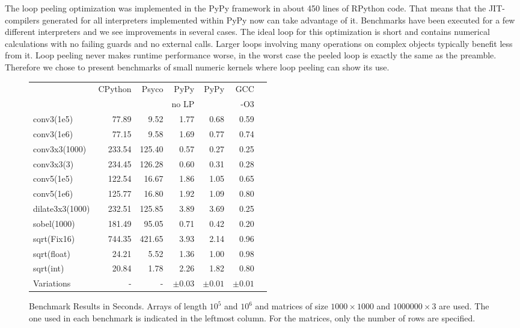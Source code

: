 \documentclass[preprint]{sigplanconf}
\begin{document}
The loop peeling optimization was implemented in the PyPy
framework in about 450 lines of RPython code. That means that the JIT-compilers generated for all
interpreters implemented within PyPy now can take advantage of
it. Benchmarks have been executed for a few different interpreters and
we see improvements in several cases. The ideal loop for this optimization
is short and contains numerical calculations with no failing guards and no
external calls. Larger loops involving many operations on complex objects
typically benefit less from it. Loop peeling never makes runtime performance worse, in
the worst case the peeled loop is exactly the same as the preamble. Therefore we
chose to present benchmarks of small numeric kernels where loop peeling can show
its use.

\begin{figure}
\begin{center}
{\smaller
\begin{tabular}{|l|r|r|r|r|r|r|}
\hline
 & CPython & Psyco & PyPy  & PyPy & GCC \\
 &         &       & no LP &      & -O3 \\
\hline
conv3(1e5) & 77.89 & 9.52 & 1.77  & 0.68 &  0.59 \\
\hline
conv3(1e6) & 77.15 & 9.58 & 1.69  & 0.77 &  0.74 \\
\hline
conv3x3(1000) & 233.54 & 125.40 & 0.57 & 0.27 & 0.25 \\
\hline
conv3x3(3) & 234.45 & 126.28 & 0.60 & 0.31 & 0.28 \\
\hline
conv5(1e5) & 122.54 & 16.67 & 1.86  & 1.05 &  0.65\\
\hline
conv5(1e6) & 125.77 & 16.80 & 1.92 & 1.09 &  0.80 \\
\hline
dilate3x3(1000) & 232.51 & 125.85 & 3.89 & 3.69 & 0.25 \\
\hline
sobel(1000) & 181.49 & 95.05 & 0.71 & 0.42 & 0.20 \\
\hline
sqrt(Fix16) & 744.35 & 421.65 & 3.93  & 2.14  & 0.96 \\
\hline
sqrt(float) & 24.21 & 5.52 & 1.36 & 1.00 & 0.98\\
\hline
sqrt(int) & 20.84 & 1.78 & 2.26 & 1.82  & 0.80 \\
\hline
\hline
Variations & - & - & $\pm 0.03$ & $\pm 0.01$ & $\pm 0.01$ \\
\hline
\end{tabular}
}
\end{center}
\label{fig:benchmarks}
\caption{Benchmark Results in Seconds. Arrays of length $10^5$ and
  $10^6$ and matrices of size $1000\times 1000$ and $1000000 \times
  3$ are used. The one used in each benchmark is indicated in
  the leftmost column. For the matrices, only the number of rows are
  specified.} 
\end{figure}
\end{document}
